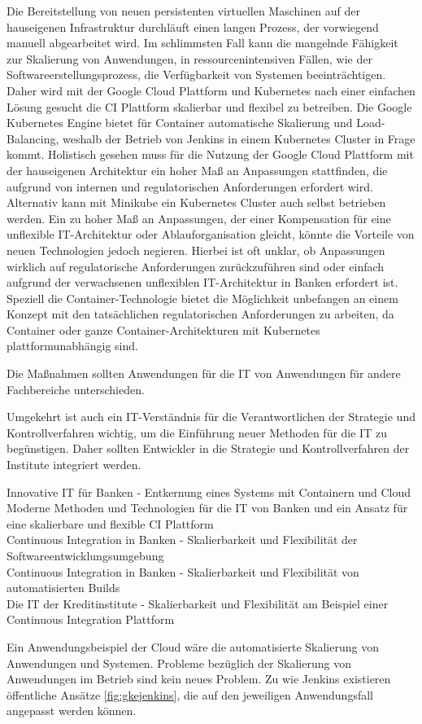 Die Bereitstellung von neuen persistenten virtuellen Maschinen auf der hauseigenen Infrastruktur durchläuft einen langen Prozess, der vorwiegend manuell abgearbeitet wird. Im schlimmsten Fall kann die mangelnde Fähigkeit zur Skalierung von Anwendungen, in ressourcenintensiven Fällen, wie der Softwareerstellungsprozess, die Verfügbarkeit von Systemen beeinträchtigen. Daher wird mit der Google Cloud Plattform und Kubernetes nach einer einfachen Lösung gesucht die CI Plattform skalierbar und flexibel zu betreiben. Die Google Kubernetes Engine bietet für Container automatische Skalierung und Load-Balancing, weshalb der Betrieb von Jenkins in einem Kubernetes Cluster in Frage kommt. Holistisch gesehen muss für die Nutzung der Google Cloud Plattform mit der hauseigenen Architektur ein hoher Maß an Anpassungen stattfinden, die aufgrund von internen und regulatorischen Anforderungen erfordert wird. Alternativ kann mit Minikube ein Kubernetes Cluster auch selbst betrieben werden.
Ein zu hoher Maß an Anpassungen, der einer Kompensation für eine unflexible IT-Architektur oder Ablauforganisation gleicht, könnte die Vorteile von neuen Technologien jedoch negieren. Hierbei ist oft unklar, ob Anpassungen wirklich auf regulatorische Anforderungen zurückzuführen sind oder einfach aufgrund der verwachsenen unflexiblen IT-Architektur in Banken erfordert ist. Speziell die Container-Technologie bietet die Möglichkeit unbefangen an einem Konzept mit den tatsächlichen regulatorischen Anforderungen zu arbeiten, da Container oder ganze Container-Architekturen mit Kubernetes plattformunabhängig sind.


Die Maßnahmen sollten Anwendungen für die IT von Anwendungen für andere Fachbereiche unterschieden.

Umgekehrt ist auch ein IT-Verständnis für die Verantwortlichen der Strategie und Kontrollverfahren wichtig, um die Einführung neuer Methoden für die IT zu begünstigen. 
Daher sollten Entwickler in die Strategie und Kontrollverfahren der Institute integriert werden.


Innovative IT für Banken - Entkernung eines Systems mit Containern und Cloud\\
Moderne Methoden und Technologien für die IT von Banken und ein Ansatz für eine skalierbare und flexible CI Plattform \\
Continuous Integration in Banken - Skalierbarkeit und Flexibilität der Softwareentwicklungsumgebung\\
Continuous Integration in Banken - Skalierbarkeit und Flexibilität von automatisierten Builds\\
Die IT der Kreditinstitute - Skalierbarkeit und Flexibilität am Beispiel einer Continuous Integration Plattform


Ein Anwendungsbeispiel der Cloud wäre die automatisierte Skalierung von Anwendungen und Systemen.
Probleme bezüglich der Skalierung von Anwendungen im Betrieb sind kein neues Problem. Zu  wie Jenkins existieren öffentliche Ansätze \ref{fig:gkejenkins}, die auf den jeweiligen Anwendungsfall angepasst werden können.